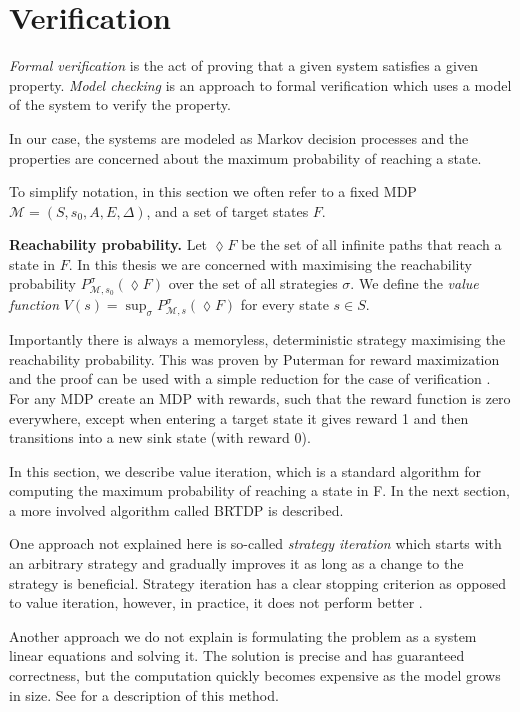 \section{Verification}

{\em Formal verification} is the act of proving that a given system satisfies
a given property. {\em Model
checking} is an approach to formal verification which uses a model of
the system to verify the property.

In our case, the systems are modeled as Markov decision processes and
the properties are concerned about the maximum probability of reaching a
state.

To simplify notation, in this section we often refer to a fixed MDP $\mathcal{M} =
(S,s_0,A,E,\Delta)$, and a set of target states $F$.

\noindent \textbf{Reachability probability.}
Let $\lozenge F$ be the set of all infinite paths that reach a state in $F$.
In this thesis we are concerned with maximising the reachability
probability $P^\sigma_{\mathcal{M},s_0}(\lozenge F)$ over the set of all
strategies $\sigma$.
We define the {\em value function} $V(s) = \sup_{\sigma}
P^\sigma_{\mathcal{M},s}(\lozenge F)$ for every state $s \in S$.

Importantly there is always a memoryless, deterministic strategy maximising the
reachability probability. This was proven by Puterman \parencite{puterman}
for reward maximization and the proof can be used with a simple
reduction for the case of verification \parencite{verification_complexity}.
For any MDP create an MDP with rewards, such that the reward function
is zero everywhere, except when entering a target state it gives reward 1
and then transitions into a new sink state (with reward 0).

In this section, we describe value iteration,
which is a standard algorithm for computing the maximum probability of
reaching a state in F. In the next section, a more involved algorithm
called BRTDP is described.

One approach not explained here is so-called {\em strategy iteration}
which starts with an arbitrary strategy and gradually improves it as
long as a change to the strategy is beneficial. Strategy iteration has
a clear stopping criterion as opposed to value iteration, however, in
practice, it does not perform better \parencite{forejt}.

Another approach we do not explain is formulating the problem as a system
linear equations and solving it. The solution is precise and has
guaranteed correctness, but the computation quickly becomes expensive as
the model grows in size.  See \parencite{forejt} for a description of
this method.

